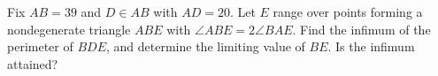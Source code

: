 Fix $ AB=39 $ and $ D\in AB $ with $ AD=20 $. Let $ E $ range over points forming a nondegenerate triangle $ ABE $ with $\angle ABE=2\angle BAE $. Find the infimum of the perimeter of $ BDE $, and determine the limiting value of $ BE $. Is the infimum attained?
